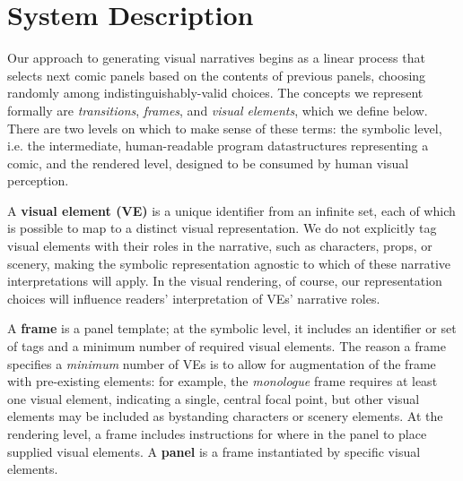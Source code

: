 \section{System Description}

Our approach to generating visual narratives begins as a linear
process that selects next comic panels based on the contents of previous
panels, choosing randomly among indistinguishably-valid choices.
The concepts we represent formally are {\em transitions}, {\em frames}, and
{\em visual elements}, which we define below. There are two levels on which
to make sense of these terms: the symbolic level, i.e. the intermediate,
human-readable program datastructures representing a comic, and the
rendered level, designed to be consumed by human visual perception.

A {\bf visual element (VE)} is a unique identifier from an infinite set,
each of which is possible to map to a distinct visual representation.
We do not explicitly tag visual elements with their roles in the narrative,
such as characters, props, or scenery, making the symbolic representation
agnostic to which of these narrative interpretations will apply. In the
visual rendering, of course, our representation choices will influence
readers' interpretation of VEs' narrative roles.

A {\bf frame} is a panel template; at the symbolic level, it
includes an identifier or set of tags and a minimum number of required
visual elements. The reason a frame specifies a {\em minimum} number of VEs
is to allow for augmentation of the frame with pre-existing elements: for
example, the {\em monologue} frame requires at least one visual element,
indicating a single, central focal point, but other visual elements may be
included as bystanding characters or scenery elements.
At the rendering level, a frame includes instructions for where in the
panel to place supplied visual elements.
A {\bf panel} is a frame instantiated by specific visual elements.


